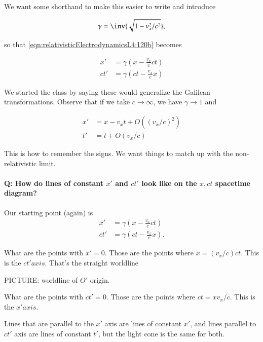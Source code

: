 We want some shorthand to make this easier to write and introduce

\begin{equation}\label{eqn:relativisticElectrodynamicsL4:130}
\gamma = \inv{\sqrt{1 - v_x^2/c^2}},
\end{equation}

so that \ref{eqn:relativisticElectrodynamicsL4:120b} becomes

\begin{align}\label{eqn:relativisticElectrodynamicsL4:140}
x' &=  \gamma \left( x - \frac{v_x}{c} ct \right) \\
ct' &=  \gamma \left( ct - \frac{v_x}{c} x \right)
\end{align}

We started the class by saying these would generalize the Galilean transformations.  Observe that if we take $c \rightarrow \infty$, we have $\gamma \rightarrow 1$ and 

\begin{align}\label{eqn:relativisticElectrodynamicsL4:150}
x' &= x - v_x t + O((v_x/c)^2) \\
t' &= t  + O(v_x/c)
\end{align}

This is how to remember the signs.  We want things to match up with the non-relativistic limit.

\paragraph{Q: How do lines of constant $x'$ and $ct'$ look like on the $x,ct$ spacetime diagram?}

Our starting point (again) is
\begin{align}\label{eqn:relativisticElectrodynamicsL4:140b}
x' &=  \gamma \left( x - \frac{v_x}{c} ct \right) \\
ct' &=  \gamma \left( ct - \frac{v_x}{c} x \right).
\end{align}

What are the points with $x' = 0$.  Those are the points where $x = (v_x/c) c t$.  This is the $ct' axis$.  That's the straight worldline

PICTURE: worldline of $O'$ origin.

What are the points with $ct' = 0$.  Those are the points where $c t = x v_x/c$.  This is the $x' axis$.

Lines that are parallel to the $x'$ axis are lines of constant $x'$, and lines parallel to $ct'$ axis are lines of constant $t'$, but the light cone is the same for both.

